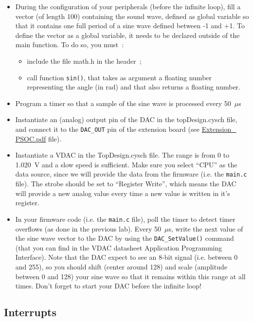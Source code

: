 \begin{itemize}
	\item During the configuration of your peripherals (before the infinite loop), fill a vector (of length 100) containing the sound wave, defined as global variable so that it contains one full period of a sine wave defined between -1 and +1. To define the vector as a global variable, it needs to be declared outside of the main function. 
    To do so, you must~:
	\begin{itemize}
		\item include the file math.h in the header~;
		\item call function \texttt{sin()}, that takes as argument a floating number representing the angle (in rad) and that also returns a floating number.
	\end{itemize}
	\item Program a timer so that a sample of the sine wave is processed every 50~$\mu$s
	\item Instantiate an (analog) output pin of the DAC in the topDesign.cysch file, and connect it to the \texttt{DAC\_OUT} pin of the extension board (see \url{Extension\_ PSOC.pdf} file). 
	\item Instantiate a VDAC in the TopDesign.cysch file. The range is from 0 to 1.020~V and a slow speed is sufficient. Make sure you select ``CPU'' as the data source, since we will provide the data from the firmware (i.e. the \texttt{main.c} file). The strobe should be set to ``Register Write'', which means the DAC will provide a new analog value every time a new value is written in it's register. 
	\item In your firmware code (i.e. the \texttt{main.c} file), poll the timer to detect timer overflows (as done in the previous lab). Every 50~$\mu$s, write the next value of the sine wave vector to the DAC by using the \texttt{DAC\_SetValue()} command (that you can find in the VDAC datasheet Application Programming Interface). Note that the DAC expect to see an 8-bit signal (i.e. between 0 and 255), so you should shift (center around 128) and scale (amplitude between 0 and 128) your sine wave so that it remains within this range at all times. Don't forget to start your DAC before the infinite loop! 
\end{itemize}





\newpage
\subsection{Interrupts}

